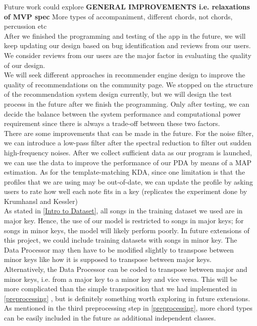 Future work could explore
\textbf{GENERAL IMPROVEMENTS i.e. relaxations of MVP spec} 
More types of accompaniment, different chords, not chords, percussion etc
\\
After we finished the programming and testing of the app in the future, we will keep updating our design based on bug identification and reviews from our users.
We consider reviews from our users are the major factor in evaluating the quality of our design.
\\
We will seek different approaches in recommender engine design to improve the quality of recommendations on the community page. 
We stopped on the structure of the recommendation system design currently, but we will design the test process in the future after we finish the programming. 
Only after testing, we can decide the balance between the system performance and computational power requirement since there is always a trade-off between these two factors.
\\
There are some improvements that can be made in the future. 
For the noise filter, we can introduce a low-pass filter after the spectral reduction to filter out sudden high-frequency noises. 
After we collect sufficient data as our program is launched, we can use the data to improve the performance of our PDA by means of a MAP estimation. 
As for the template-matching KDA, since one limitation is that the profiles that we are using may be out-of-date, we can update the profile by asking users to rate how well each note fits in a key (replicates the experiment done by Krumhansl and Kessler)
\\
As stated in \cref{Intro to Dataset}, all songs in the training dataset we used are in major key. 
Hence, the use of our model is restricted to songs in major keys; for songs in minor keys, the model will likely perform poorly. 
In future extensions of this project, we could include training datasets with songs in minor key.
The Data Processor may then have to be modified slightly to transpose between minor keys like how it is supposed to transpose between major keys. 
Alternatively, the Data Processor can be coded to transpose between major and minor keys, i.e. from a major key to a minor key and vice versa. 
This will be more complicated than the simple transposition that we had implemented in \cref{preprocessing} \cite{BasicMusicTheoryBook}, but is definitely something worth exploring in future extensions. 
\\
As mentioned in the third preprocessing step in \cref{preprocessing}, more chord types can be easily included in the future as additional independent classes. 
